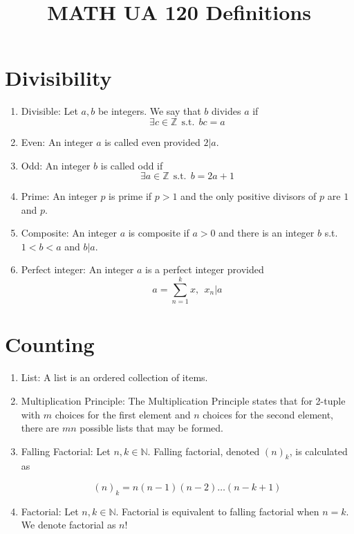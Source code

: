 \documentclass{article}
\title{MATH UA 120 Definitions}
\date{}
\begin{document}
	\maketitle
	
	\section*{Divisibility}
	
	\begin{enumerate}
		\item Divisible: Let $a,b$ be integers.
		We say that $b$ divides $a$ if
		\[\exists c\in\mathbb{Z}\:\: \text{s.t.} \:\: bc=a\]
		
		\item Even: An integer $a$ is called even provided $2|a$.
		
		\item Odd: An integer $b$ is called odd if
		\[\exists a\in\mathbb{Z} \:\: \text{s.t.} \:\: b=2a+1\]
		
		\item Prime: An integer $p$ is prime if $p>1$ and the only positive divisors of $p$ are $1$ and $p$.
		
		\item Composite: An integer $a$ is composite if $a>0$ and there is an integer $b$ s.t. $1<b<a$ and $b|a$.
		
		\item Perfect integer: An integer $a$ is a perfect integer provided
		\[a=\sum_{n=1}^k x,\:\: x_n|a\]
	\end{enumerate}
	
	\section*{Counting}
	
	\begin{enumerate}
		\item List: A list is an ordered collection of items.
		
		\item Multiplication Principle: The Multiplication Principle states that for 2-tuple with $m$ choices for the first element and $n$ choices for the second element, there are $mn$ possible lists that may be formed.
		
		\item Falling Factorial: Let $n,k\in\mathbb{N}$.
		Falling factorial, denoted $(n)_k$, is calculated as
		
		\[(n)_k=n(n-1)(n-2) \dots (n-k+1)\]
		
		\item Factorial: Let $n,k\in\mathbb{N}$.
		Factorial is equivalent to falling factorial when $n=k$.
		We denote factorial as $n!$
	
	\end{enumerate}
	
\end{document}
